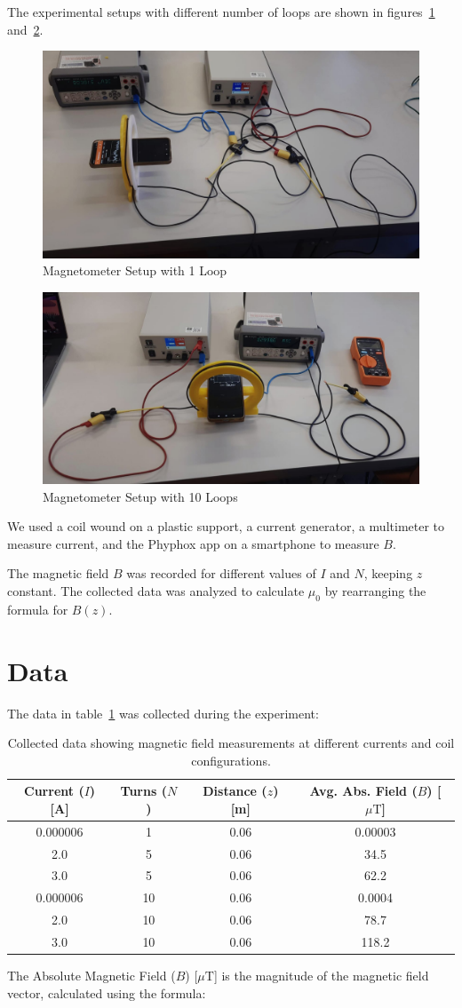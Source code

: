 \documentclass[notitlepage]{report}
\numberwithin{equation}{section}
\theoremstyle{plain}
\theoremstyle{definition}
\theoremstyle{remark}
\begin{document}
The experimental setups with different number of loops are shown in
figures~\ref{fig:magnetometer1} and~\ref{fig:magnetometer2}.
\begin{figure}
    \centering
    \includegraphics[width=0.5\linewidth]{figures/Magnetometer_1loop.jpeg}
    \caption{Magnetometer Setup with 1 Loop}\label{fig:magnetometer1}
\end{figure}
\begin{figure}
    \centering
    \includegraphics[width=0.5\linewidth]{figures/Magnetometer_multipleloops.jpeg}
    \caption{Magnetometer Setup with 10 Loops}\label{fig:magnetometer2}
\end{figure}

We used a coil wound on a plastic support, a current generator, a multimeter to measure current, and the Phyphox app on a smartphone to measure \(B\).

The magnetic field \(B\) was recorded for different values of \(I\) and \(N\), keeping \(z\) constant. The collected data was analyzed to calculate \(\mu_0\) by rearranging the formula for \(B(z)\).

\section{Data}
The data in table~\ref{tab:data} was collected during the experiment:

\begin{table}[h]
\centering
\begin{tabular}{cccc}
\toprule
Current (\(I\)) [A] & Turns (\(N\)) & Distance (\(z\)) [m] &
Avg. Abs. Field          (\(B\)) [\(\mu\text{T}\)]\\
\midrule
0.000006& 1& 0.06& 0.00003\\
2.0 & 5& 0.06& 34.5\\
3.0 & 5& 0.06& 62.2\\
0.000006& 10& 0.06& 0.0004\\
2.0 & 10& 0.06& 78.7\\
3.0 & 10& 0.06& 118.2\\
\bottomrule
\end{tabular}
\caption{Collected data showing magnetic field measurements at different
currents and coil configurations.}\label{tab:data}
\end{table}
The Absolute Magnetic Field (\(B\)) [\(\mu\text{T}\)] is the magnitude of the magnetic field vector, calculated using the formula:
\end{document}

